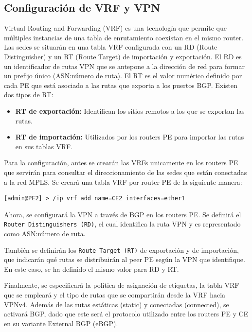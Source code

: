 \subsection{Configuración de VRF y VPN}
Virtual Routing and Forwarding (VRF) es una tecnología que permite que múltiples
instancias de una tabla de enrutamiento coexistan en el mismo router. Las sedes se
situarán en una tabla VRF configurada con un RD (Route Distinguisher) y un RT (Route Target)
de importación y exportación. El RD es un identificador de rutas VPN que se antepone a la dirección
de red para formar un prefijo único (ASN:número de ruta). El RT es el valor numérico definido por
cada PE que está asociado a las rutas que exporta a los puertos BGP. Existen dos tipos de RT:

\begin{itemize}
	\item \textbf{RT de exportación:} Identifican los sitios remotos a los que se exportan las rutas.
	\item \textbf{RT de importación:} Utilizados por los routers PE para importar las rutas en sus tablas VRF.
\end{itemize}

Para la configuración, antes se crearán las VRFs unicamente en los routers PE que servirán para consultar el direccionamiento de las sedes que están conectadas a la red MPLS. Se creará una tabla VRF por router PE de la siguiente manera:
\begin{lstlisting}[language=RouterOS]
[admin@PE2] > /ip vrf add name=CE2 interfaces=ether1 
\end{lstlisting}

Ahora, se configurará la VPN a través de BGP en los routers PE. Se definirá el \texttt{Router Distinguishers (RD)}, el cual identifica la ruta VPN y es representado como ASN:número de ruta.

\vspace{0.5cm}
También se definirán los \texttt{Route Target (RT)} de exportación y de importación, que indicarán qué rutas se distribuirán al peer PE según la VPN que identifique. En este caso, se ha definido el mismo valor para RD y RT.

\vspace{0.5cm}
Finalmente, se especificará la política de asignación de etiquetas, la tabla VRF que se empleará y el tipo de rutas que se compartirán desde la VRF hacia VPNv4. Además de las rutas estáticas (static) y conectadas (connected), se activará BGP, dado que este será el protocolo utilizado entre los routers PE y CE en su variante External BGP (eBGP).

